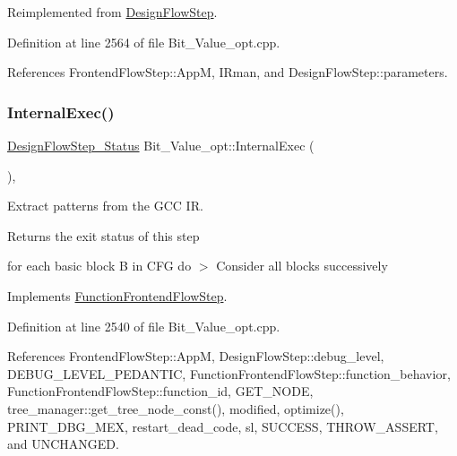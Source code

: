 Reimplemented from \hyperlink{classDesignFlowStep_a44b50683382a094976e1d432a7784799}{Design\+Flow\+Step}.



Definition at line 2564 of file Bit\+\_\+\+Value\+\_\+opt.\+cpp.



References Frontend\+Flow\+Step\+::\+AppM, I\+Rman, and Design\+Flow\+Step\+::parameters.

\mbox{\label{classBit__Value__opt_a54603f3942c41184e00ac94da081d044}} 
\subsubsection{\texorpdfstring{Internal\+Exec()}{InternalExec()}}
{\footnotesize\ttfamily \hyperlink{design__flow__step_8hpp_afb1f0d73069c26076b8d31dbc8ebecdf}{Design\+Flow\+Step\+\_\+\+Status} Bit\+\_\+\+Value\+\_\+opt\+::\+Internal\+Exec (\begin{DoxyParamCaption}{ }\end{DoxyParamCaption})\hspace{0.3cm}{\ttfamily [override]}, {\ttfamily [virtual]}}



Extract patterns from the G\+CC IR. 

\begin{DoxyReturn}{Returns}
the exit status of this step 
\end{DoxyReturn}
for each basic block B in C\+FG do $>$ Consider all blocks successively 

Implements \hyperlink{classFunctionFrontendFlowStep_a00612f7fb9eabbbc8ee7e39d34e5ac68}{Function\+Frontend\+Flow\+Step}.



Definition at line 2540 of file Bit\+\_\+\+Value\+\_\+opt.\+cpp.



References Frontend\+Flow\+Step\+::\+AppM, Design\+Flow\+Step\+::debug\+\_\+level, D\+E\+B\+U\+G\+\_\+\+L\+E\+V\+E\+L\+\_\+\+P\+E\+D\+A\+N\+T\+IC, Function\+Frontend\+Flow\+Step\+::function\+\_\+behavior, Function\+Frontend\+Flow\+Step\+::function\+\_\+id, G\+E\+T\+\_\+\+N\+O\+DE, tree\+\_\+manager\+::get\+\_\+tree\+\_\+node\+\_\+const(), modified, optimize(), P\+R\+I\+N\+T\+\_\+\+D\+B\+G\+\_\+\+M\+EX, restart\+\_\+dead\+\_\+code, sl, S\+U\+C\+C\+E\+SS, T\+H\+R\+O\+W\+\_\+\+A\+S\+S\+E\+RT, and U\+N\+C\+H\+A\+N\+G\+ED.


